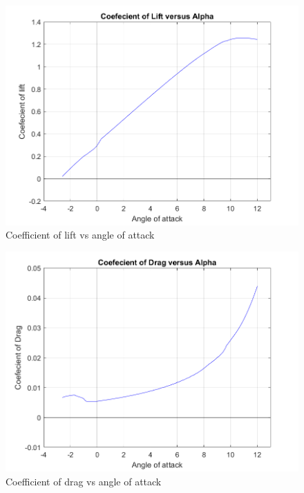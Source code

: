 \documentclass[12 pt]{article}
\begin{document}
\begin{figure}[H]
    \centering
     \includegraphics[scale = 0.8]{Codes/Week 6/Cl_alpha.png}
    \caption{Coefficient of lift vs angle of attack}
    \label{fig:enter-label}
\end{figure}

\begin{figure}[H]
    \centering
    \includegraphics[scale = 0.8]{Codes/Week 6/Cd_alpha.png}
    \caption{Coefficient of drag vs angle of attack}
    \label{fig:enter-label}
\end{figure}
\end{document}
